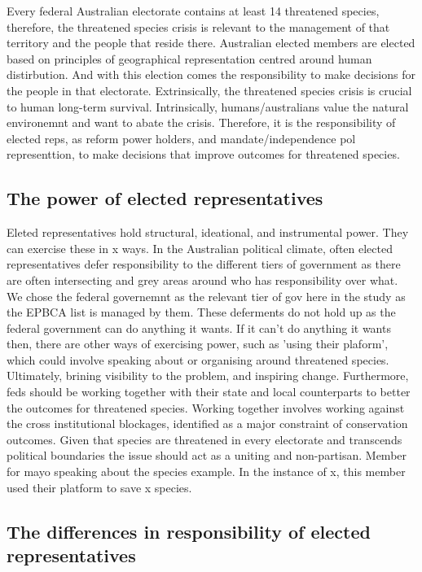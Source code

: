 \documentclass[a4paper,11pt]{article}
\begin{document}
Every federal Australian electorate contains at least 14 threatened species, therefore, the threatened species crisis is relevant to the management of that territory and the people that reside there. Australian elected members are elected based on principles of geographical representation centred around human distirbution. And with this election comes the responsibility to make decisions for the people in that electorate. Extrinsically, the threatened species crisis is crucial to human long-term survival. Intrinsically, humans/australians value the natural environemnt and want to abate the crisis. Therefore, it is the responsibility of elected reps, as reform power holders, and mandate/independence pol representtion, to make decisions that improve outcomes for threatened species.

\subsection{The power of elected representatives}

Eleted representatives hold structural, ideational, and instrumental power. They can exercise these in x ways.
In the Australian political climate, often elected representatives defer responsibility to the different tiers of government as there are often intersecting and grey areas around who has responsibility over what. We chose the federal governemnt as the relevant tier of gov here in the study as the EPBCA list is managed by them. These deferments do not hold up as the federal government can do anything it wants. If it can't do anything it wants then, there are other ways of exercising power, such as 'using their plaform', which could involve speaking about or organising around threatened species. Ultimately, brining visibility to the problem, and inspiring change.
Furthermore, feds should be working together with their state and local counterparts to better the outcomes for threatened species. Working together involves working against the cross institutional blockages, identified as a major constraint of conservation outcomes.
Given that species are threatened in every electorate and transcends political boundaries the issue should act as a uniting and non-partisan.
Member for mayo speaking about the species example.
In the instance of x, this member used their platform to save x species.

\subsection{The differences in responsibility of elected representatives}
\end{document}
